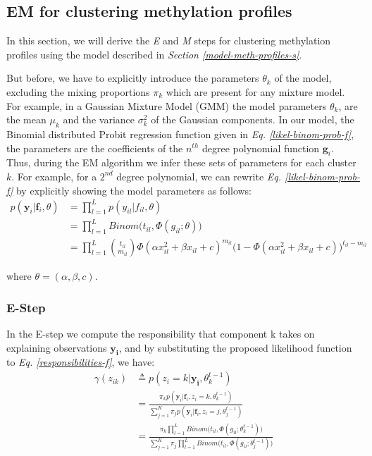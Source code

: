 \subsection{EM for clustering methylation profiles}
In this section, we will derive the \emph{E} and \emph{M} steps for clustering methylation profiles using the model described in \emph{Section \ref{model-meth-profiles-s}}.

But before, we have to explicitly introduce the parameters $\theta_{k}$ of the model, excluding the mixing proportions $\pi_{k}$ which are present for any mixture model. For example, in a Gaussian Mixture Model (GMM) the model parameters $\theta_{k}$, are the mean $\mu_{k}$ and the variance $\sigma_{k}^{2}$ of the Gaussian components. In our model, the Binomial distributed Probit regression function given in \emph{Eq. \ref{likel-binom-prob-f}}, the parameters are the coefficients of the $n^{th}$ degree polynomial function $\mathbf{g}_{i}$. Thus, during the EM algorithm we infer these sets of parameters for each cluster $k$. For example, for a $2^{nd}$ degree polynomial, we can rewrite \emph{Eq. \ref{likel-binom-prob-f}} by explicitly showing the model parameters as follows:
\begin{equation} \label{likel-binom-prob-example1-f}
  \begin{split}
	p(\mathbf{y}_{i}|\mathbf{f}_{i}, \theta) & = \prod_{l=1}^{L} p(y_{il}|f_{il}, \theta) \\
							 & = \prod_{l=1}^{L} Binom \big(t_{il}, \Phi(g_{il}; \theta)\big) \\
							 & = \prod_{l=1}^{L} \binom{t_{il}}{m_{il}} \Phi(\alpha x_{il}^{2} + \beta x_{il} + c)^{m_{il}} (1 - \Phi(\alpha x_{il}^{2} + \beta x_{il} + c)\big)^{t_{il} - m_{il}}
  \end{split}
\end{equation}

where $\theta = (\alpha, \beta, c)$.

\subsubsection{E-Step}
In the E-step we compute the responsibility that component k takes on explaining observations $\mathbf{y_{i}}$, and by substituting the proposed likelihood function to \emph{Eq. \ref{responsibilities-f}}, we have:
\begin{equation} \label{responsibilities-model-f}
  \begin{split}
	\gamma(z_{ik}) & \triangleq p(z_{i}=k|\mathbf{y_{i}},\theta_{k}^{t-1}) \\
				   & = \frac{\pi_{k}p(\mathbf{y}_{i}|\mathbf{f}_{i},z_{i}=k,\theta_{k}^{t-1})}{\sum\limits_{j=1}^{K} \pi_{j}p(\mathbf{y}_{i}|\mathbf{f}_{i},z_{i}=j,\theta_{j}^{t-1})} \\
				   & = \frac{\pi_{k} \prod\limits_{l=1}^{L} Binom \big(t_{il}, \Phi(g_{il}; \theta_{k}^{t-1})\big)} {\sum\limits_{j=1}^{K} \pi_{j} \prod\limits_{l=1}^{L} Binom \big(t_{il}, \Phi(g_{il}; \theta_{j}^{t-1})\big)}
  \end{split}
\end{equation}

